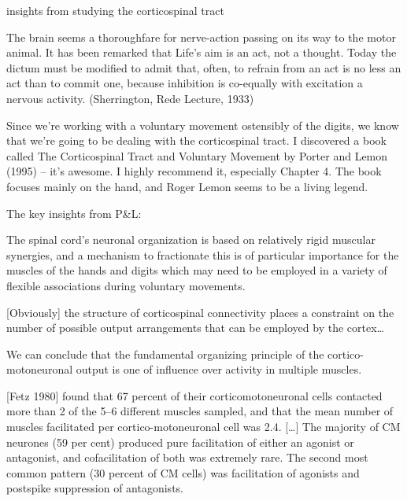 {            insights from studying the corticospinal tract

            The brain seems a thoroughfare for nerve-action passing on
            its way to the motor animal. It has been remarked that
            Life's aim is an act, not a thought. Today the dictum must
            be modified to admit that, often, to refrain from an act is
            no less an act than to commit one, because inhibition is
            co-equally with excitation a nervous activity. (Sherrington,
            Rede Lecture, 1933)

            Since we're working with a voluntary movement ostensibly of
            the digits, we know that we're going to be dealing with the
            corticospinal tract. I discovered a book called The
            Corticospinal Tract and Voluntary Movement by Porter and
            Lemon (1995) -- it's awesome. I highly recommend it,
            especially Chapter 4. The book focuses mainly on the hand,
            and Roger Lemon seems to be a living legend.

            The key insights from P\&L:

            The spinal cord's neuronal organization is based on
            relatively rigid muscular synergies, and a mechanism to
            fractionate this is of particular importance for the muscles
            of the hands and digits which may need to be employed in a
            variety of flexible associations during voluntary movements.

            {[}Obviously{]} the structure of corticospinal connectivity
            places a constraint on the number of possible output
            arrangements that can be employed by the cortex\ldots{}

            We can conclude that the fundamental organizing principle of
            the cortico-motoneuronal output is one of influence over
            activity in multiple muscles.

            {[}Fetz 1980{]} found that 67 percent of their
            corticomotoneuronal cells contacted more than 2 of the 5--6
            different muscles sampled, and that the mean number of
            muscles facilitated per cortico-motoneuronal cell was 2.4.
            {[}\ldots{]} The majority of CM neurones (59 per cent)
            produced pure facilitation of either an agonist or
            antagonist, and cofacilitation of both was extremely rare.
            The second most common pattern (30 percent of CM cells) was
            facilitation of agonists and postspike suppression of
            antagonists.

}
